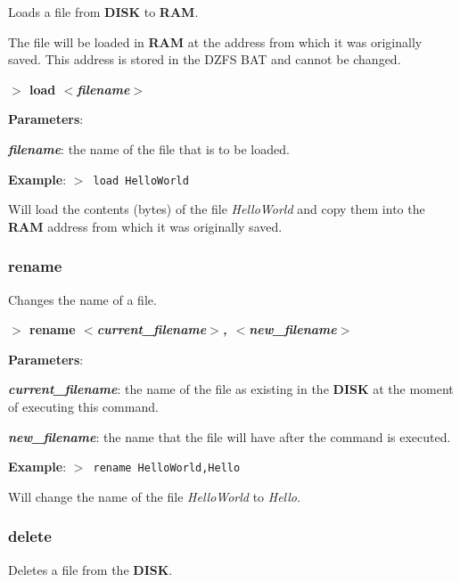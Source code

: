         Loads a file from \textbf{DISK} to \textbf{RAM}.
        
        The file will be loaded in \textbf{RAM} at the address from which it was
        originally saved. This address is stored in the DZFS BAT and cannot be
        changed. 

        \hspace{1.9cm}\textbf{$>$ load \textit{$<$filename$>$}}

        \textbf{Parameters}:

        \hspace{1cm}\textbf{\textit{filename}}: the name of the file that is to
        be loaded.

        \textbf{Example}: \texttt{$>$ load HelloWorld}

        Will load the contents (bytes) of the file \textit{HelloWorld} and copy
        them into the \textbf{RAM} address from which it was originally saved.

        \subsubsection{{rename}}
        Changes the name of a file.

        \hspace{1.9cm}\textbf{$>$ rename \textit{$<$current\_filename$>$,
        $<$new\_filename$>$}}

        \textbf{Parameters}:

        \hspace{1cm}\textbf{\textit{current\_filename}}: the name of the file as
        existing in the \textbf{DISK} at the moment of executing this command.
        
        \hspace{1cm}\textbf{\textit{new\_filename}}: the name that the file will
        have after the command is executed.

        \textbf{Example}: \texttt{$>$ rename HelloWorld,Hello}

        Will change the name of the file \textit{HelloWorld} to \textit{Hello}.

        \subsubsection{{delete}}
        Deletes a file from the \textbf{DISK}.

